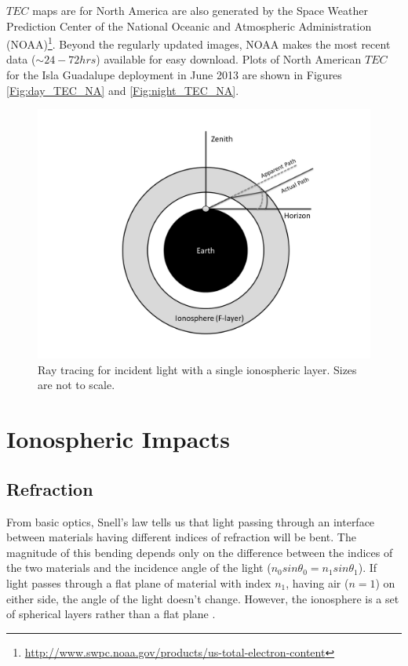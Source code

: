 $TEC$ maps are for North America are also generated by the Space Weather Prediction Center of the National Oceanic and Atmospheric Administration (NOAA)\footnote{\url{http://www.swpc.noaa.gov/products/us-total-electron-content}}. Beyond the regularly updated images, NOAA makes the most recent data ($\sim 24-72 hrs$) available for easy download. Plots of North American $TEC$ for the Isla Guadalupe deployment in June 2013 are shown in Figures \ref{Fig:day_TEC_NA} and \ref{Fig:night_TEC_NA}. 


\begin{figure}[htb]
\begin{center}
\includegraphics[width=0.95\linewidth]{Ionosphere/figures/refraction.png}
\caption{Ray tracing for incident light with a single ionospheric layer. Sizes are not to scale. }
\label{Fig:iono_refrac}
\end{center}
\end{figure}

\section{Ionospheric Impacts}

\subsection{Refraction}
From basic optics, Snell's law tells us that light passing through an interface between materials having different indices of refraction will be bent. The magnitude of this bending depends only on the difference between the indices of the two materials and the incidence angle of the light ($n_0 sin \theta_0 = n_1 sin \theta_1$). If light passes through a flat plane of material with index $n_1$, having air ($n=1$) on either side, the angle of the light doesn't change. However, the ionosphere is a set of spherical layers rather than a flat plane \cite{thompson_2001}. 


